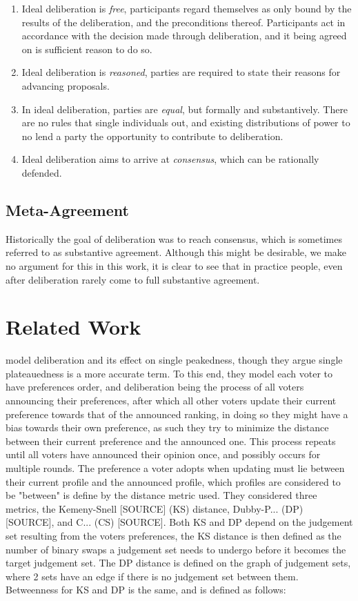 \begin{enumerate}
	\label{list:ideal-deliberation}
	\setlength\itemsep{1px}
	\item  Ideal deliberation is \textit{free}, participants regard themselves as only bound by the results of the deliberation, and the preconditions thereof. Participants act in accordance with the decision made through deliberation, and it being agreed on is sufficient reason to do so.
	\item  Ideal deliberation is \textit{reasoned}, parties are required to state their reasons for advancing proposals.
	\item  In ideal deliberation, parties are \textit{equal}, but formally and substantively. There are no rules that single individuals out, and existing distributions of power to no lend a party the opportunity to contribute to deliberation.
	\item  Ideal deliberation aims to arrive at \textit{consensus}, which can be rationally defended. 
\end{enumerate}

\subsection{Meta-Agreement}
Historically the goal of deliberation was to reach consensus, which is sometimes referred to as substantive agreement. Although this might be desirable, we make no argument for this in this work, it is clear to see that in practice people, even after deliberation rarely come to full substantive agreement. \citet{List_2002}

\section{Related Work}
\citet{Soroush_Rafiee_Rad_Roy_2021} model deliberation and its effect on single peakedness, though they argue single plateauedness is a more accurate term. To this end, they model each voter to have preferences order, and deliberation being the process of all voters announcing their preferences, after which all other voters update their current preference towards that of the announced ranking, in doing so they might have a bias towards their own preference, as such they try to minimize the distance between their current preference and the announced one. This process repeats until all voters have announced their opinion once, and possibly occurs for multiple rounds. The preference a voter adopts when updating must lie between their current profile and the announced profile, which profiles are considered to be "between" is define by the distance metric used. They considered three metrics, the Kemeny-Snell [SOURCE] (KS) distance, Dubby-P... (DP) [SOURCE], and C... (CS) [SOURCE]. Both KS and DP depend on the judgement set resulting from the voters preferences, the KS distance is then defined as the number of binary swaps a judgement set needs to undergo before it becomes the target judgement set. The DP distance is defined on the graph of judgement sets, where 2 sets have an edge if there is no judgement set between them. Betweenness for KS and DP is the same, and is defined as follows: 

